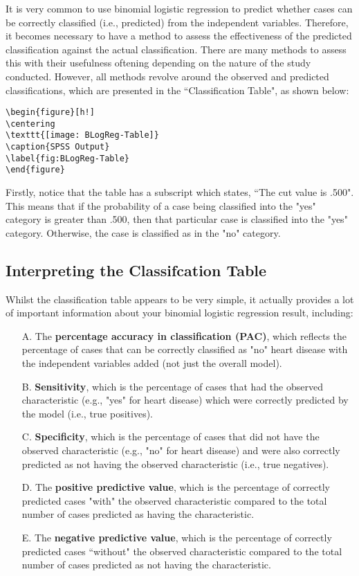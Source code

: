 \documentclass[12pt, a4paper]{article}
\theoremstyle{plain}
\theoremstyle{definition}
\theoremstyle{remark}
\begin{document}
It is very common to use binomial logistic regression to predict whether cases can be correctly classified (i.e., predicted) from the independent variables. Therefore, it becomes necessary to have a method to assess the effectiveness of the predicted classification against the actual classification. There are many methods to assess this with their usefulness oftening depending on the nature of the study conducted. However, all methods revolve around the observed and predicted classifications, which are presented in the ``Classification Table", as shown below:

\begin{verbatim}
\begin{figure}[h!]
\centering
\texttt{[image: BLogReg-Table]}
\caption{SPSS Output}
\label{fig:BLogReg-Table}
\end{figure}
\end{verbatim}

Firstly, notice that the table has a subscript which states, ``The cut value is .500". This means that if the probability of a case being classified into the "yes" category is greater than .500, then that particular case is classified into the "yes" category. 
Otherwise, the case is classified as in the "no" category. 

\subsection{Interpreting the Classifcation Table}
Whilst the classification table appears to be very simple, it actually provides a lot of important information about your binomial logistic regression result, including:


\begin{itemize}
	\item[A.] The \textbf{percentage accuracy in classification (PAC)}, which reflects the percentage of cases that can be correctly classified as "no" heart disease with the independent variables added (not just the overall model).
	\item[B.] \textbf{Sensitivity}, which is the percentage of cases that had the observed characteristic (e.g., "yes" for heart disease) which were correctly predicted by the model (i.e., true positives).
	\item[C.] \textbf{Specificity}, which is the percentage of cases that did not have the observed characteristic (e.g., "no" for heart disease) and were also correctly predicted as not having the observed characteristic (i.e., true negatives).
	\item[D.] The \textbf{positive predictive value}, which is the percentage of correctly predicted cases "with" the observed characteristic compared to the total number of cases predicted as having the characteristic.
	\item[E.] The \textbf{negative predictive value}, which is the percentage of correctly predicted cases ``without" the observed characteristic compared to the total number of cases predicted as not having the characteristic.
\end{itemize}
\end{document}
